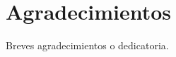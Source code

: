 \documentclass[12pt,twoside,titlepage]{report}
\newcommand{\nombreautor}{Cristina Lozano Bautista}
\newcommand{\nombretutor}{Aaron Sujar}
\newcommand{\titulotrabajo}{Título del Trabajo de Fin de Grado}
\newcommand{\escuelalargo}{Escuela Técnica Superior de Ingeniería Informática}
\newcommand{\universidad}{Universidad Rey Juan Carlos}
\newcommand{\fecha}{Junio de 2026}
\newcommand\blankpage{%
    \newpage
    \null
    \thispagestyle{empty}%
    \newpage}
\begin{document}








\hypersetup{pageanchor=true}

\normalsize
\afterpage{\blankpage} %






\setlength{\parskip}{0.75em}
\renewcommand{\baselinestretch}{1.25}

\setcounter{page}{2}



\chapter*{Agradecimientos}

Breves agradecimientos o dedicatoria.

\afterpage{\blankpage}
\end{document}
